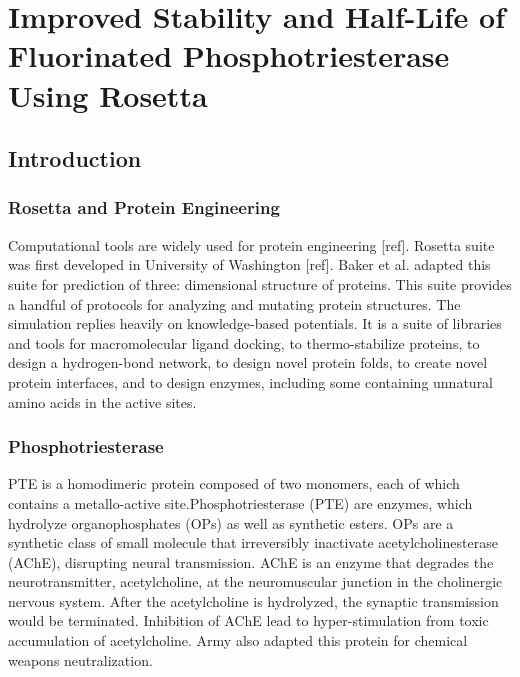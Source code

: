 \chapter{Improved Stability and Half-Life of Fluorinated Phosphotriesterase
Using Rosetta} 
\label{chap:rosetta}

\begin{refsection}

\section{Introduction}

\subsection{Rosetta and Protein Engineering}
\label{sec:rosetta}

Computational tools are widely used for protein engineering [ref]. Rosetta
suite was first developed in University of Washington [ref]. Baker et al.
adapted this suite for prediction of three: dimensional structure of proteins.
This suite provides a handful of protocols for analyzing and mutating protein
structures. The simulation replies heavily on knowledge-based potentials. It is
a suite of libraries and tools for macromolecular ligand docking, to
thermo-stabilize proteins, to design a hydrogen-bond network, to design novel
protein folds, to create novel protein interfaces, and to design enzymes,
including some containing unnatural amino acids in the active sites.

\subsection{Phosphotriesterase} 
\label{sec:pte}

PTE is a homodimeric protein composed of two monomers, each of which contains a
metallo-active site.Phosphotriesterase (PTE) are enzymes, which hydrolyze
organophosphates (OPs) as well as synthetic esters.\cite{Ghanem2005a} OPs are a
synthetic class of small molecule that irreversibly inactivate
acetylcholinesterase (AChE), disrupting neural transmission. AChE is an enzyme
that degrades the neurotransmitter, acetylcholine, at the neuromuscular
junction in the cholinergic nervous system. After the acetylcholine is
hydrolyzed, the synaptic transmission would be terminated. Inhibition of AChE
lead to hyper-stimulation from toxic accumulation of
acetylcholine.\cite{Soreq2001} Army also adapted this protein for chemical
weapons neutralization. \cite{Yang2014a}


\end{refsection}
